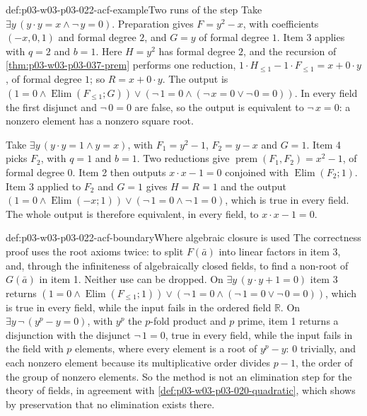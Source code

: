 \begin{hbexample}{def:p03-w03-p03-022-acf-example}{Two runs of the step}
Take \(\exists y\,(y\cdot y=x\land\neg\,y=0)\). Preparation gives
\(F=y^2-x\), with coefficients \((-x,0,1)\) and formal degree \(2\), and
\(G=y\) of formal degree \(1\). Item 3 applies with \(q=2\) and \(b=1\).
Here \(H=y^2\) has formal degree \(2\), and the recursion of
\cref{thm:p03-w03-p03-037-prem} performs one reduction,
\(1\cdot H_{\le1}-1\cdot F_{\le1}=x+0\cdot y\), of formal degree \(1\); so
\(R=x+0\cdot y\). The output is
\((1=0\land\operatorname{Elim}(F_{\le1};G))\lor(\neg\,1=0\land(\neg\,x=0\lor\neg\,0=0))\).
In every field the first disjunct and \(\neg\,0=0\) are false, so the
output is equivalent to \(\neg\,x=0\): a nonzero element has a nonzero
square root.

Take \(\exists y\,(y\cdot y=1\land y=x)\), with \(F_1=y^2-1\),
\(F_2=y-x\) and \(G=1\). Item 4 picks \(F_2\), with \(q=1\) and \(b=1\).
Two reductions give \(\operatorname{prem}(F_1,F_2)=x^2-1\), of formal degree
\(0\). Item 2 then outputs \(x\cdot x-1=0\) conjoined with
\(\operatorname{Elim}(F_2;1)\). Item 3 applied to \(F_2\) and \(G=1\) gives
\(H=R=1\) and the output
\((1=0\land\operatorname{Elim}(-x;1))\lor(\neg\,1=0\land\neg\,1=0)\), which
is true in every field. The whole output is therefore equivalent, in every
field, to \(x\cdot x-1=0\).
\end{hbexample}

\begin{hbwarning}{def:p03-w03-p03-022-acf-boundary}{Where algebraic closure is used}
The correctness proof uses the root axioms twice: to split \(F(\bar a)\)
into linear factors in item 3, and, through the infiniteness of
algebraically closed fields, to find a non-root of \(G(\bar a)\) in item 1.
Neither use can be dropped. On \(\exists y\,(y\cdot y+1=0)\) item 3 returns
\((1=0\land\operatorname{Elim}(F_{\le1};1))\lor(\neg\,1=0\land(\neg\,1=0\lor\neg\,0=0))\),
which is true in every field, while the input fails in the ordered field
\(\mathbb R\). On \(\exists y\,\neg\,(y^p-y=0)\), with \(y^p\) the
\(p\)-fold product and \(p\) prime, item 1 returns a disjunction with the
disjunct \(\neg\,1=0\), true in every field, while the input fails in the
field with \(p\) elements, where every element is a root of \(y^p-y\):
\(0\) trivially, and each nonzero element because its multiplicative order
divides \(p-1\), the order of the group of nonzero elements. So the method is not an elimination step for the
theory of fields, in agreement with \cref{def:p03-w03-p03-020-quadratic},
which shows by preservation that no elimination exists there.
\end{hbwarning}

